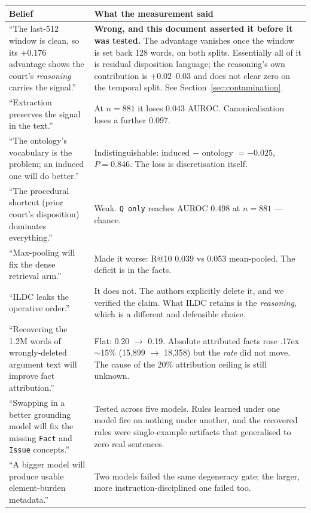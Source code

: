 \documentclass[12pt,a4paper]{article}
\newcommand{\code}[1]{\texttt{\small #1}}
\begin{document}
\begin{center}
\small
\begin{tabular}{@{}p{5.4cm}p{8.6cm}@{}}
\toprule
\textbf{Belief} & \textbf{What the measurement said} \\
\midrule
``The last-512 window is clean, so its $+0.176$ advantage shows the court's \emph{reasoning} carries
the signal.''
 & \textbf{Wrong, and this document asserted it before it was tested.} The advantage vanishes once
   the window is set back 128 words, on both splits. Essentially all of it is residual disposition
   language; the reasoning's own contribution is $+0.02$--$0.03$ and does not clear zero on the
   temporal split. See Section~\ref{sec:contamination}. \\
\addlinespace
``Extraction preserves the signal in the text.''
 & At $n=881$ it loses 0.043 AUROC. Canonicalisation loses a further 0.097. \\
\addlinespace
``The ontology's vocabulary is the problem; an induced one will do better.''
 & Indistinguishable: induced $-$ ontology $= -0.025$, $P=0.846$. The loss is discretisation
   itself. \\
\addlinespace
``The procedural shortcut (prior court's disposition) dominates everything.''
 & Weak. \code{Q only} reaches AUROC 0.498 at $n=881$ --- chance. \\
\addlinespace
``Max-pooling will fix the dense retrieval arm.''
 & Made it worse: R@10 0.039 vs 0.053 mean-pooled. The deficit is in the facts. \\
\addlinespace
``ILDC leaks the operative order.''
 & It does not. The authors explicitly delete it, and we verified the claim. What ILDC retains is
   the \emph{reasoning}, which is a different and defensible choice. \\
\addlinespace
``Recovering the 1.2M words of wrongly-deleted argument text will improve fact attribution.''
 & Flat: 0.20 $\rightarrow$ 0.19. Absolute attributed facts rose {\raise.17ex\hbox{$\scriptstyle\sim$}}15\% (15,899 $\rightarrow$ 18,358) but the
   \emph{rate} did not move. The cause of the 20\% attribution ceiling is still unknown. \\
\addlinespace
``Swapping in a better grounding model will fix the missing \code{Fact} and \code{Issue} concepts.''
 & Tested across five models. Rules learned under one model fire on nothing under another, and the
   recovered rules were single-example artifacts that generalised to zero real sentences. \\
\addlinespace
``A bigger model will produce usable element-burden metadata.''
 & Two models failed the same degeneracy gate; the larger, more instruction-disciplined one failed
   too. \\
\bottomrule
\end{tabular}
\end{center}
\end{document}
